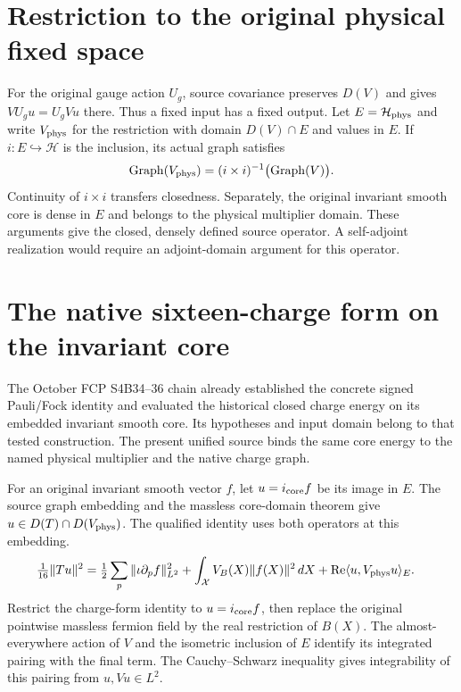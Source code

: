 \section{Restriction to the original physical fixed space}
For the original gauge action \(U_g\), source covariance preserves
\(D(V)\) and gives \(VU_gu=U_gVu\) there. Thus a fixed input has a
fixed output. Let \(E=\mathcal H_{\rm phys}\) and write
\(V_{\rm phys}\) for the restriction with domain \(D(V)\cap E\)
and values in \(E\). If \(i:E\hookrightarrow\mathcal H\) is the
inclusion, its actual graph satisfies
\[
 \operatorname{Graph}(V_{\rm phys})
   =(i\times i)^{-1}\bigl(\operatorname{Graph}(V)\bigr).
\]
Continuity of \(i\times i\) transfers closedness. Separately, the
original invariant smooth core is dense in \(E\) and belongs to the
physical multiplier domain. These arguments give the closed, densely
defined source operator. A self-adjoint realization would require
an adjoint-domain argument for this operator.

\section{The native sixteen-charge form on the invariant core}
\label{sec:multiplier-energy-join}
The October FCP S4B34--36 chain already established the concrete
signed Pauli/Fock identity and evaluated the historical closed
charge energy on its embedded invariant smooth core. Its hypotheses
and input domain belong to that tested construction. The present
unified source binds the same core energy to the named physical
multiplier and the native charge graph.

For an original invariant smooth vector \(f\), let \(u=i_{\rm core}f\)
be its image in \(E\). The source graph embedding and the massless
core-domain theorem give \(u\in D(T)\cap D(V_{\rm phys})\). The
qualified identity uses both operators at this embedding.
\begin{align}
 \tfrac1{16}\|Tu\|^2
 &=\tfrac12\sum_p\|\iota\partial_p f\|_{L^2}^2
   +\int_{\mathcal X} V_B(X)\|f(X)\|^2\,dX
   +\operatorname{Re}\langle u,V_{\rm phys}u\rangle_E .
 \label{eq:physical-multiplier-energy}
\end{align}
Restrict the charge-form identity to \(u=i_{\rm core}f\), then replace
the original pointwise
massless fermion field by the real restriction of \(B(X)\). The
almost-everywhere action of \(V\) and the isometric inclusion of
\(E\) identify its integrated pairing with the final term. The
Cauchy--Schwarz inequality gives integrability of this pairing from
\(u,Vu\in L^2\).

